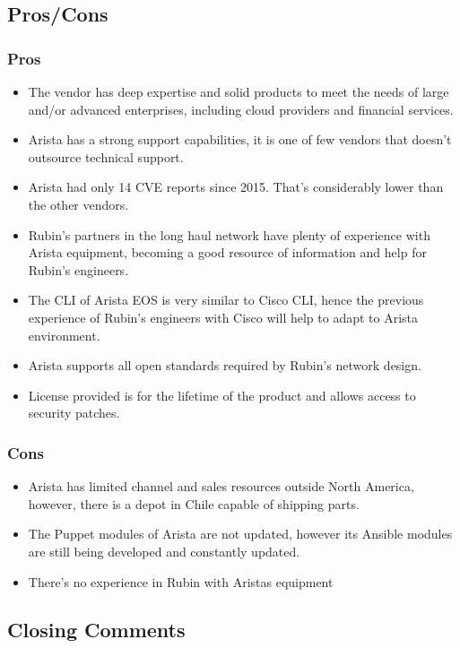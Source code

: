 \subsection{Pros/Cons}

\subsubsection{Pros}
\begin{itemize}
  \item The vendor has deep expertise and solid products to meet the needs of large and/or advanced enterprises, including cloud providers and financial services.
  \item Arista has a strong support capabilities, it is one of few vendors that doesn't outsource technical support.
  \item Arista had only 14 CVE reports since 2015. That's considerably lower than the other vendors. 
  \item Rubin's partners in the long haul network have plenty of experience with Arista equipment, becoming a good resource of information and help for Rubin's engineers. 
  \item The CLI of Arista EOS is very similar to Cisco CLI, hence the previous experience of Rubin's engineers with Cisco will help to adapt to Arista environment.
  \item Arista supports all open standards required by Rubin's network design.
  \item License provided is for the lifetime of the product and allows access to security patches.
\end{itemize}

\subsubsection{Cons}
\begin{itemize}
  \item Arista has limited channel and sales resources outside North America, however, there is a depot in Chile capable of shipping parts. 
  \item The Puppet modules of Arista are not updated, however its Ansible modules are still being developed and constantly updated. 
  \item There's no experience in Rubin with Aristas equipment
\end{itemize}

\subsection{Closing Comments}


